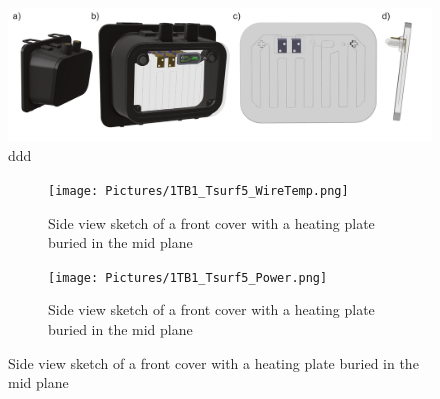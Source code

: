 \begin{figure} [H]
	\centering
	\includegraphics[scale=0.8]{Pictures/1TB1_3DModel.png}
	\caption[NEXT LiDAR Sensor Model]{ddd}
	\label{fig:1TB1Model}
\end{figure}


\begin{figure}[ht]
\centering
\begin{minipage}[b]{0.48\linewidth}
\begin{figure} [H]
	\centering
	\texttt{[image: Pictures/1TB1\_Tsurf5\_WireTemp.png]}
	\caption[Front Cover Heat Transfer Model]{Side view sketch of a front cover with a heating plate buried in the mid plane }
	\label{fig:fig1}
\end{figure}

\label{fig:minipage1}
\end{minipage}
\quad
\begin{minipage}[b]{0.48\linewidth}
\begin{figure} [H]
	\centering
	\texttt{[image: Pictures/1TB1\_Tsurf5\_Power.png]}
	\caption[Front Cover Heat Transfer Model]{Side view sketch of a front cover with a heating plate buried in the mid plane}
	\label{fig:fig1}
\end{figure}
\label{fig:minipage2}
\end{minipage}
\end{figure}


 


